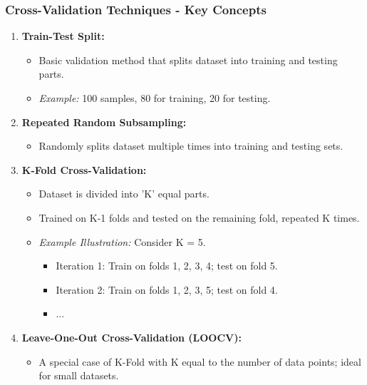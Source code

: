 \documentclass[aspectratio=169]{beamer}
\begin{document}
\begin{frame}[fragile]
    \frametitle{Cross-Validation Techniques - Key Concepts}
    \begin{enumerate}
        \item \textbf{Train-Test Split:} 
        	\begin{itemize}
            	\item Basic validation method that splits dataset into training and testing parts.
                \item \textit{Example:} 100 samples, 80 for training, 20 for testing.
            \end{itemize}

        \item \textbf{Repeated Random Subsampling:} 
        	\begin{itemize}
            	\item Randomly splits dataset multiple times into training and testing sets.
            \end{itemize}
        
        \item \textbf{K-Fold Cross-Validation:} 
        	\begin{itemize}
            	\item Dataset is divided into 'K' equal parts.
            	\item Trained on K-1 folds and tested on the remaining fold, repeated K times.
            	\item \textit{Example Illustration:} Consider K = 5.
            	\begin{itemize}
                 	\item Iteration 1: Train on folds 1, 2, 3, 4; test on fold 5.
                 	\item Iteration 2: Train on folds 1, 2, 3, 5; test on fold 4.
                 	\item ...
            	\end{itemize}
            \end{itemize}

        \item \textbf{Leave-One-Out Cross-Validation (LOOCV):} 
        	\begin{itemize}
            	\item A special case of K-Fold with K equal to the number of data points; ideal for small datasets.
            \end{itemize}
    \end{enumerate}
\end{frame}
\end{document}
